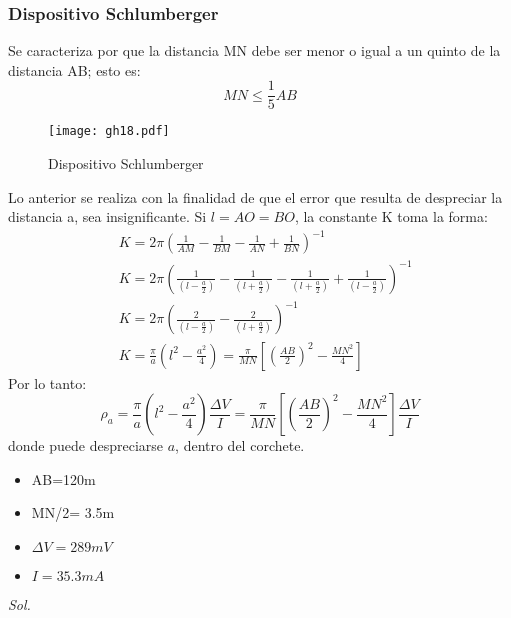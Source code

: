 \subsubsection{Dispositivo Schlumberger}
Se caracteriza por que la distancia MN debe ser menor o igual a un quinto de la distancia AB; esto es:
\begin{equation}
  MN\leq \frac{1}{5} AB
\end{equation}
\begin{figure}[h!]
\centering
  \texttt{[image: gh18.pdf]}
  \caption{Dispositivo Schlumberger}
  \label{gh18}
\end{figure}
Lo anterior se realiza con la finalidad de que el error que resulta de despreciar la distancia a, sea insignificante. Si $l=AO=BO$, la constante K toma la forma:
\begin{align*}
  &K = 2\pi\left(\frac{1}{AM} - \frac{1}{BM} - \frac{1}{AN} + \frac{1}{BN}\right)^{- 1}\\
  &K = 2\pi\left(\frac{1}{\left(l -\frac{a}{2} \right)} -\frac{1}{\left(l +\frac{a}{2} \right)} -\frac{1}{\left(l +\frac{a}{2} \right)} +\frac{1}{\left(l -\frac{a}{2} \right)}\right)^{- 1}\\
  &K = 2\pi\left(\frac{2}{\left(l -\frac{a}{2} \right)} -\frac{2}{\left(l +\frac{a}{2} \right)}\right)^{ - 1}\\
  &K = \frac{\pi}{a} \left(l^2 - \frac{a^2}{4} \right) =\frac{\pi}{MN}\left[\left(\frac{AB}{2}\right)^2 - \frac{MN^2}{4}\right]
\end{align*}
Por lo tanto:
\begin{equation}
  \rho_a = \frac{\pi}{a}\left(l^2 - \frac{a^2}{4} \right)\frac{\Delta V}{I} = \frac{\pi}{MN}\left[\left(\frac{AB}{2}\right)^2 - \frac{MN^2}{4} \right]\frac{\Delta V}{I}
\end{equation}
donde puede despreciarse $a$, dentro del corchete.
\begin{problem}[Datos]
  \begin{itemize}
    \item AB=120m
    \item MN/2= 3.5m
    \item $\Delta V=289mV$
    \item $I=35.3mA$
  \end{itemize}
\end{problem}
\textit{ Sol. }

